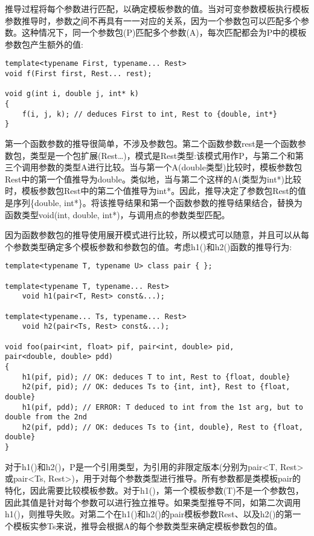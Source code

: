 
推导过程将每个参数进行匹配，以确定模板参数的值。当对可变参数模板执行模板参数推导时，参数之间不再具有一一对应的关系，因为一个参数包可以匹配多个参数。这种情况下，同一个参数包(P)匹配多个参数(A)，每次匹配都会为P中的模板参数包产生额外的值:

\begin{lstlisting}[style=styleCXX]
template<typename First, typename... Rest>
void f(First first, Rest... rest);

void g(int i, double j, int* k)
{
	f(i, j, k); // deduces First to int, Rest to {double, int*}
}
\end{lstlisting}

第一个函数参数的推导很简单，不涉及参数包。第二个函数参数rest是一个函数参数包，类型是一个包扩展(Rest…)，模式是Rest类型:该模式用作P，与第二个和第三个调用参数的类型A进行比较。当与第一个A(double类型)比较时，模板参数包Rest中的第一个值推导为double。类似地，当与第二个这样的A(类型为int*)比较时，模板参数包Rest中的第二个值推导为int*。因此，推导决定了参数包Rest的值是序列\{double, int*\}。将该推导结果和第一个函数参数的推导结果结合，替换为函数类型void(int, double, int*)，与调用点的参数类型匹配。

因为函数参数包的推导使用展开模式进行比较，所以模式可以随意，并且可以从每个参数类型确定多个模板参数和参数包的值。考虑h1()和h2()函数的推导行为:

\begin{lstlisting}[style=styleCXX]
template<typename T, typename U> class pair { };

template<typename T, typename... Rest>
	void h1(pair<T, Rest> const&...);

template<typename... Ts, typename... Rest>
	void h2(pair<Ts, Rest> const&...);

void foo(pair<int, float> pif, pair<int, double> pid,
pair<double, double> pdd)
{
	h1(pif, pid); // OK: deduces T to int, Rest to {float, double}
	h2(pif, pid); // OK: deduces Ts to {int, int}, Rest to {float, double}
	h1(pif, pdd); // ERROR: T deduced to int from the 1st arg, but to double from the 2nd
	h2(pif, pdd); // OK: deduces Ts to {int, double}, Rest to {float, double}
}
\end{lstlisting}

对于h1()和h2()，P是一个引用类型，为引用的非限定版本(分别为pair<T, Rest>或pair<Ts, Rest>)，用于对每个参数类型进行推导。所有参数都是类模板pair的特化，因此需要比较模板参数。对于h1()，第一个模板参数(T)不是一个参数包，因此其值是针对每个参数可以进行独立推导。如果类型推导不同，如第二次调用h1()，则推导失败。对第二个在h1()和h2()的pair模板参数Rest、以及h2()的第一个模板实参Ts来说，推导会根据A的每个参数类型来确定模板参数包的值。

